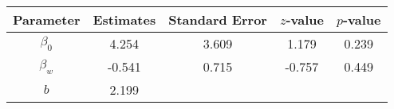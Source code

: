 \begin{table}[ht]
\centering
\begin{tabular}{ccccc}
  \hline
Parameter & Estimates & Standard Error & $z$-value & $p$-value \\ 
  \hline
$\beta_0$ & 4.254 & 3.609 & 1.179 & 0.239 \\ 
  $\beta_w$ & -0.541 & 0.715 & -0.757 & 0.449 \\ 
  $b$ & 2.199 &  &  &  \\ 
   \hline
\end{tabular}
\end{table}
